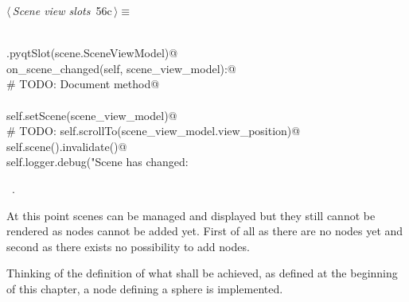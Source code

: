 \documentclass[
    a4paper,      %
    10pt,         %
    openright,    %
    notitlepage,  %
    parskip=half, %
]{scrreprt}       %
\theoremstyle{definition}                    %
\begin{document}
\begin{flushleft} \small
\begin{minipage}{\linewidth}\label{scrap89}\raggedright\small
{} $\langle\,${\itshape Scene view slots}\nobreak\ {\footnotesize {56c}}$\,\rangle\equiv$
\vspace{-1exm}
\begin{list}{}{} \item
\mbox{}\lstinline@@\\
\mbox{}\lstinline@QtCore.pyqtSlot(scene.SceneViewModel)@\\
\mbox{}\lstinline@def on_scene_changed(self, scene_view_model):@\\
\mbox{}\lstinline@    # TODO: Document method@\\
\mbox{}\lstinline@@\\
\mbox{}\lstinline@    self.setScene(scene_view_model)@\\
\mbox{}\lstinline@    # TODO: self.scrollTo(scene_view_model.view_position)@\\
\mbox{}\lstinline@    self.scene().invalidate()@\\
\mbox{}\lstinline@    self.logger.debug("Scene has changed: %s", scene_view_model)@{\NWsep}
\end{list}
\vspace{-1.5ex}
\footnotesize
\begin{list}{}{\setlength{\itemsep}{-\parsep}\setlength{\itemindent}{-\leftmargin}}
\item \NWtxtMacroRefIn\ .

\item{}
\end{list}
\end{minipage}\vspace{4ex}
\end{flushleft}
At this point scenes can be managed and displayed but they still cannot be
rendered as nodes cannot be added yet. First of all as there are no nodes yet
and second as there exists no possibility to add nodes.

Thinking of the definition of what shall be achieved, as defined at the
beginning of this chapter, a node defining a sphere is implemented.
\end{document}

